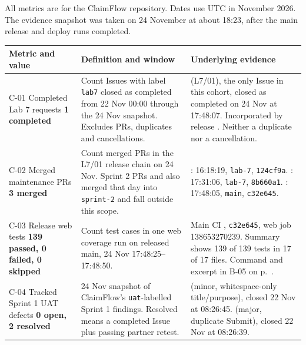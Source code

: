 \label{ev:metrics}
All metrics are for the ClaimFlow repository. Dates use UTC in November 2026. The evidence snapshot was taken on 24 November at about 18:23, after the main release and deploy runs completed.

\begin{longtable}{@{}R{3.5cm}R{4.9cm}R{7.7cm}@{}}
\toprule
\textbf{Metric and value} & \textbf{Definition and window} & \textbf{Underlying evidence} \\ \midrule \endhead
C-01 \newline Completed Lab 7 requests \newline \textbf{1 completed} &
Count Issues with label \texttt{lab7} closed as completed from 22 Nov 00:00 through the 24 Nov snapshot. Excludes PRs, duplicates and cancellations. &
 (L7/01), the only Issue in this cohort, closed as completed on 24 Nov at 17:48:07. Incorporated by release . Neither a duplicate nor a cancellation. \\
C-02 \newline Merged maintenance PRs \newline \textbf{3 merged} &
Count merged PRs in the L7/01 release chain on 24 Nov. Sprint 2 PRs  and  also merged that day into \texttt{sprint-2} and fall outside this scope. &
: 16:18:19, \texttt{lab-7}, \texttt{124cf9a}. \newline
{}: 17:31:06, \texttt{lab-7}, \texttt{8b660a1}. \newline
{}: 17:48:05, \texttt{main}, \texttt{c32e645}. \\
C-03 \newline Release web tests \newline \textbf{139 passed, 0 failed, 0 skipped} &
Count test cases in one web coverage run on released main, 24 Nov 17:48:25--17:48:50. &
Main CI , \texttt{c32e645}, web job 138653270239. Summary shows 139 of 139 tests in 17 of 17 files. Command and excerpt in B-05 on p.~\pageref{ev:release}. \\
C-04 \newline Tracked Sprint 1 UAT defects \newline \textbf{0 open, 2 resolved} &
24 Nov snapshot of ClaimFlow's \texttt{uat}-labelled Sprint 1 findings. Resolved means a completed Issue plus passing partner retest. &
 (minor, whitespace-only title/purpose), closed 22 Nov at 08:26:45. \newline
{} (major, duplicate Submit), closed 22 Nov at 08:26:39. \newline

\end{longtable}
